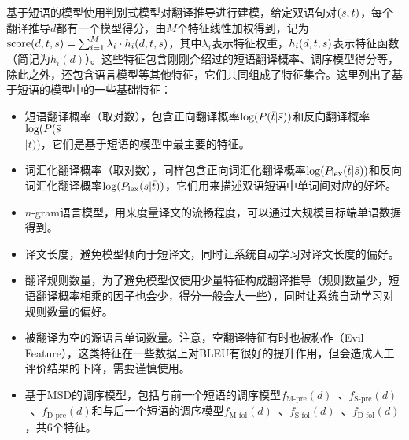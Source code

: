 \parinterval 基于短语的模型使用判别式模型对翻译推导进行建模，给定双语句对$({s},{t})$，每个翻译推导$d$都有一个模型得分，由$M$个特征线性加权得到，记为$\textrm{score}(d,{t},{s}) = \sum_{i=1}^{M} \lambda_i \cdot h_i (d,{t},{s})$，其中$\lambda_i$表示特征权重，$h_i (d,{t},{s})$表示特征函数（简记为$h_i (d)$）。这些特征包含刚刚介绍过的短语翻译概率、调序模型得分等，除此之外，还包含语言模型等其他特征，它们共同组成了特征集合。这里列出了基于短语的模型中的一些基础特征：

\begin{itemize}
\vspace{0.5em}
\item 短语翻译概率（取对数），包含正向翻译概率$\textrm{log}({P}(\bar{t}|\bar{s}))$和反向翻译概率$\textrm{log}({P}(\bar{s}$\\$|\bar{t}))$，它们是基于短语的模型中最主要的特征。
\vspace{0.5em}
\item 词汇化翻译概率（取对数），同样包含正向词汇化翻译概率$\textrm{log}({P}_{\textrm{lex}}(\bar{t}|\bar{s}))$和反向词汇化翻译概率$\textrm{log}({P}_{\textrm{lex}}(\bar{s}|\bar{t}))$，它们用来描述双语短语中单词间对应的好坏。
\vspace{0.5em}
\item $n$-gram语言模型，用来度量译文的流畅程度，可以通过大规模目标端单语数据得到。
\vspace{0.5em}
\item 译文长度，避免模型倾向于短译文，同时让系统自动学习对译文长度的偏好。
\vspace{0.5em}
\item 翻译规则数量，为了避免模型仅使用少量特征构成翻译推导（规则数量少，短语翻译概率相乘的因子也会少，得分一般会大一些），同时让系统自动学习对规则数量的偏好。
\vspace{0.5em}
\item 被翻译为空的源语言单词数量。注意，空翻译特征有时也被称作{\small{}}（Evil Feature），这类特征在一些数据上对BLEU有很好的提升作用，但会造成人工评价结果的下降，需要谨慎使用。
\vspace{0.5em}
\item 基于MSD的调序模型，包括与前一个短语的调序模型$f_{\textrm{M-pre}}(d)$\ 、$f_{\textrm{S-pre}}(d)$\ 、$f_{\textrm{D-pre}}(d)$和与后一个短语的调序模型$f_{\textrm{M-fol}}(d)$\ 、$f_{\textrm{S-fol}}(d)$\ 、$f_{\textrm{D-fol}}(d)$，共6个特征。
\vspace{0.5em}
\end{itemize}

